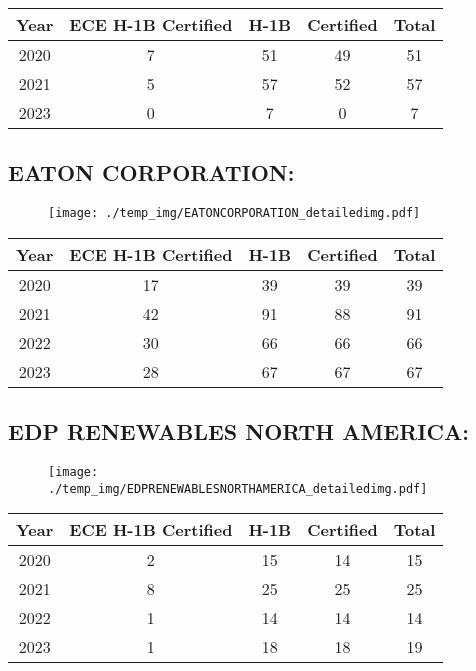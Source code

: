 \documentclass{article}%
\begin{document}
%
\begin{longtable}{c|c|c|c|c}%
\hline%
Year&ECE H{-}1B Certified&H{-}1B&Certified&Total\\%
\hline%
2020&7&51&49&51\\%
\hline%
2021&5&57&52&57\\%
\hline%
2023&0&7&0&7\\%
\hline%
\end{longtable}

%
\newpage%
\subsection{EATON CORPORATION:}%
\label{subsec:EATONCORPORATION}%
\label{EATONCORPORATIONdetailed}%


\begin{figure}[htbp]%
\centering%
\texttt{[image: ./temp\_img/EATONCORPORATION\_detailedimg.pdf]}%
\end{figure}

%
\begin{longtable}{c|c|c|c|c}%
\hline%
Year&ECE H{-}1B Certified&H{-}1B&Certified&Total\\%
\hline%
2020&17&39&39&39\\%
\hline%
2021&42&91&88&91\\%
\hline%
2022&30&66&66&66\\%
\hline%
2023&28&67&67&67\\%
\hline%
\end{longtable}

%
\newpage%
\subsection{EDP RENEWABLES NORTH AMERICA:}%
\label{subsec:EDPRENEWABLESNORTHAMERICA}%
\label{EDPRENEWABLESNORTHAMERICAdetailed}%


\begin{figure}[htbp]%
\centering%
\texttt{[image: ./temp\_img/EDPRENEWABLESNORTHAMERICA\_detailedimg.pdf]}%
\end{figure}

%
\begin{longtable}{c|c|c|c|c}%
\hline%
Year&ECE H{-}1B Certified&H{-}1B&Certified&Total\\%
\hline%
2020&2&15&14&15\\%
\hline%
2021&8&25&25&25\\%
\hline%
2022&1&14&14&14\\%
\hline%
2023&1&18&18&19\\%
\hline%
\end{longtable}
\end{document}
